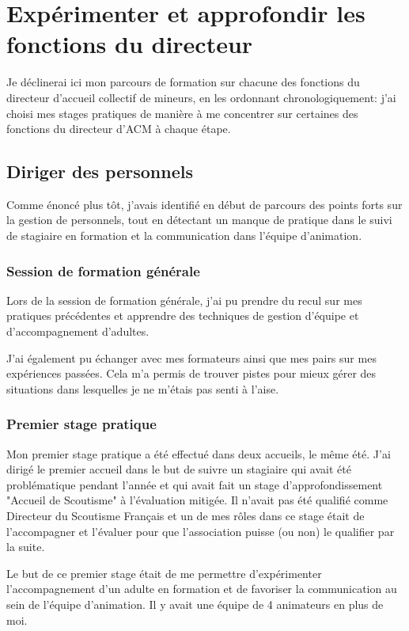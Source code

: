 \documentclass[titlepage,11pt,a4paper]{article}
\begin{document}
\section{Expérimenter et approfondir les fonctions du directeur}

Je déclinerai ici mon parcours de formation sur chacune des fonctions du directeur
d'accueil collectif de mineurs, en les ordonnant chronologiquement: j'ai choisi mes stages
pratiques de manière à me concentrer sur certaines des fonctions du directeur d'ACM à
chaque étape.

\subsection{Diriger des personnels}

Comme énoncé plus tôt, j'avais identifié en début de parcours des points forts sur la
gestion de personnels, tout en détectant un manque de pratique dans le suivi de stagiaire
en formation et la communication dans l'équipe d'animation.

\subsubsection{Session de formation générale}

Lors de la session de formation générale, j'ai pu prendre du recul sur mes pratiques
précédentes et apprendre des techniques de gestion d'équipe et d'accompagnement
d'adultes.

J'ai également pu échanger avec mes formateurs ainsi que mes pairs sur mes expériences
passées. Cela m'a permis de trouver pistes pour mieux gérer des situations dans lesquelles
je ne m'étais pas senti à l'aise.

\subsubsection{Premier stage pratique}

Mon premier stage pratique a été effectué dans deux accueils, le même été. J'ai dirigé le
premier accueil dans le but de suivre un stagiaire qui avait été problématique pendant
l'année et qui avait fait un stage d'approfondissement "Accueil de Scoutisme" à
l'évaluation mitigée. Il n'avait pas été qualifié comme Directeur du Scoutisme Français et
un de mes rôles dans ce stage était de l'accompagner et l'évaluer pour que l'association puisse (ou
non) le qualifier par la suite.

Le but de ce premier stage était de me permettre d'expérimenter l'accompagnement d'un
adulte en formation et de favoriser la communication au sein de l'équipe d'animation. Il y
avait une équipe de 4 animateurs en plus de moi.
\end{document}
